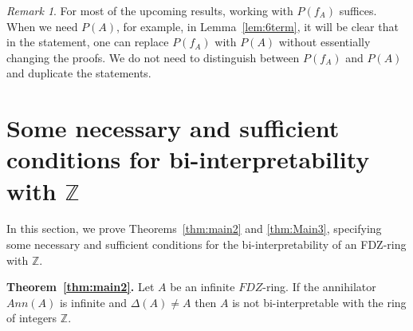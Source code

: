 \documentclass{article}
\theoremstyle{remark}
\newtheorem{remark}[theorem]{Remark}
\def\Z{{\mathbb{Z}}}
\begin{document}
\begin{remark}
    For most of the upcoming results, working with $P(f_A)$ suffices. When we need $P(A)$, for example, in Lemma~\ref{lem:6term}, it will be clear that in the statement, one can replace $P(f_A)$ with $P(A)$ without essentially changing the proofs. We do not need to distinguish between $P(f_A)$ and $P(A)$ and duplicate the statements. 
\end{remark}
\section{Some necessary and sufficient conditions for bi-interpretability with \texorpdfstring{$\Z$}{Z}}\label{sec:biint}
In this section, we prove Theorems~\ref{thm:main2} and \ref{thm:Main3}, specifying some necessary and sufficient conditions for the bi-interpretability of an FDZ-ring with $\Z$. \medskip

\noindent \textbf{Theorem~\ref{thm:main2}.} Let $A$ be an infinite $FDZ$-ring. If the annihilator $Ann(A)$ is infinite and $\Delta(A)\neq A$ then $A$ is not bi-interpretable with the ring of integers $\Z$.
\end{document}

